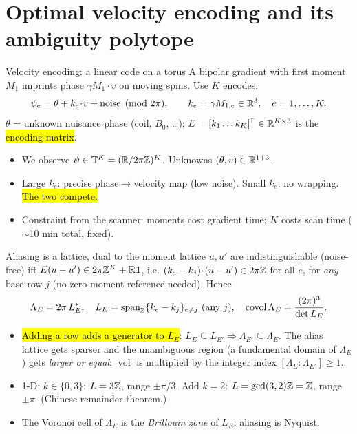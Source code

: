 \section{Optimal velocity encoding and its ambiguity polytope}

\begin{frame}{Velocity encoding: a linear code on a torus}
A bipolar gradient with first moment $M_1$ imprints phase $\gamma M_1\!\cdot v$ on moving spins. Use $K$ encodes:
\[ \psi_e=\theta+k_e\!\cdot\! v+\text{noise}\pmod{2\pi},\qquad k_e=\gamma M_{1,e}\in\mathbb R^3,\quad e=1,\dots,K. \]
$\theta$ = unknown nuisance phase (coil, $B_0$, \dots); $E=[k_1\dots k_K]^{\!\top}\in\mathbb R^{K\times3}$ is the \hl{encoding matrix}.
\pause
\begin{itemize}
\item We observe $\psi\in\mathbb T^K=(\mathbb R/2\pi\mathbb Z)^K$. Unknowns $(\theta,v)\in\mathbb R^{1+3}$.
\item Large $k_e$: precise phase$\to$velocity map (low noise). Small $k_e$: no wrapping. \hl{The two compete.}
\item Constraint from the scanner: moments cost gradient time; $K$ costs scan time ($\sim$10 min total, fixed).
\end{itemize}
\end{frame}

\begin{frame}{Aliasing is a lattice, dual to the moment lattice}
$u,u'$ are indistinguishable (noise-free) iff $E(u-u')\in2\pi\mathbb Z^K+\mathbb R\mathbf 1$, i.e. $(k_e-k_j)\!\cdot\!(u-u')\in2\pi\mathbb Z$ for all $e$, for \emph{any} base row $j$ (no zero-moment reference needed). Hence
\[ \Lambda_E=2\pi\,L_E^{*},\quad L_E=\operatorname{span}_{\mathbb Z}\{k_e-k_j\}_{e\neq j}\ (\text{any } j),\quad \operatorname{covol}\Lambda_E=\frac{(2\pi)^3}{\det L_E}. \]
\pause
\begin{itemize}
\item \hl{Adding a row adds a generator to $L_E$}: $L_E\subseteq L_{E'}\Rightarrow\Lambda_{E'}\subseteq\Lambda_E$. The alias lattice gets sparser and the unambiguous region (a fundamental domain of $\Lambda_E$) gets \emph{larger or equal}: $\operatorname{vol}$ is multiplied by the integer index $[\Lambda_E:\Lambda_{E'}]\ge1$.
\item 1-D: $k\in\{0,3\}$: $L=3\mathbb Z$, range $\pm\pi/3$. Add $k=2$: $L=\gcd(3,2)\mathbb Z=\mathbb Z$, range $\pm\pi$. (Chinese remainder theorem.)
\item The Voronoi cell of $\Lambda_E$ is the \emph{Brillouin zone} of $L_E$: aliasing is Nyquist.
\end{itemize}
\end{frame}

